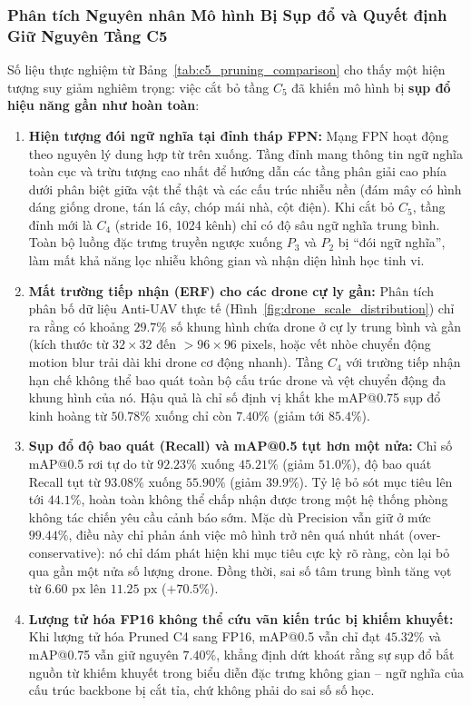 \documentclass[11pt,a4paper]{article}
\begin{document}
\subsubsection{Phân tích Nguyên nhân Mô hình Bị Sụp đổ và Quyết định Giữ Nguyên Tầng C5}
Số liệu thực nghiệm từ Bảng~\ref{tab:c5_pruning_comparison} cho thấy một hiện tượng suy giảm nghiêm trọng: việc cắt bỏ tầng $C_5$ đã khiến mô hình bị \textbf{sụp đổ hiệu năng gần như hoàn toàn}:
\begin{enumerate}
    \item \textbf{Hiện tượng đói ngữ nghĩa tại đỉnh tháp FPN:}
    Mạng FPN hoạt động theo nguyên lý dung hợp từ trên xuống. Tầng đỉnh mang thông tin ngữ nghĩa toàn cục và trừu tượng cao nhất để hướng dẫn các tầng phân giải cao phía dưới phân biệt giữa vật thể thật và các cấu trúc nhiễu nền (đám mây có hình dáng giống drone, tán lá cây, chóp mái nhà, cột điện). Khi cắt bỏ $C_5$, tầng đỉnh mới là $C_4$ (stride 16, 1024 kênh) chỉ có độ sâu ngữ nghĩa trung bình. Toàn bộ luồng đặc trưng truyền ngược xuống $P_3$ và $P_2$ bị ``đói ngữ nghĩa'', làm mất khả năng lọc nhiễu không gian và nhận diện hình học tinh vi.
    \item \textbf{Mất trường tiếp nhận (ERF) cho các drone cự ly gần:}
    Phân tích phân bố dữ liệu Anti-UAV thực tế (Hình~\ref{fig:drone_scale_distribution}) chỉ ra rằng có khoảng $29.7\%$ số khung hình chứa drone ở cự ly trung bình và gần (kích thước từ $32 \times 32$ đến $> 96 \times 96$ pixels, hoặc vết nhòe chuyển động motion blur trải dài khi drone cơ động nhanh). Tầng $C_4$ với trường tiếp nhận hạn chế không thể bao quát toàn bộ cấu trúc drone và vệt chuyển động đa khung hình của nó. Hậu quả là chỉ số định vị khắt khe mAP@0.75 sụp đổ kinh hoàng từ $50.78\%$ xuống chỉ còn $7.40\%$ (giảm tới $85.4\%$).
    \item \textbf{Sụp đổ độ bao quát (Recall) và mAP@0.5 tụt hơn một nửa:}
    Chỉ số mAP@0.5 rơi tự do từ $92.23\%$ xuống $45.21\%$ (giảm $51.0\%$), độ bao quát Recall tụt từ $93.08\%$ xuống $55.90\%$ (giảm $39.9\%$). Tỷ lệ bỏ sót mục tiêu lên tới $44.1\%$, hoàn toàn không thể chấp nhận được trong một hệ thống phòng không tác chiến yêu cầu cảnh báo sớm. Mặc dù Precision vẫn giữ ở mức $99.44\%$, điều này chỉ phản ánh việc mô hình trở nên quá nhút nhát (over-conservative): nó chỉ dám phát hiện khi mục tiêu cực kỳ rõ ràng, còn lại bỏ qua gần một nửa số lượng drone. Đồng thời, sai số tâm trung bình tăng vọt từ $6.60\text{ px}$ lên $11.25\text{ px}$ ($+70.5\%$).
    \item \textbf{Lượng tử hóa FP16 không thể cứu vãn kiến trúc bị khiếm khuyết:}
    Khi lượng tử hóa Pruned C4 sang FP16, mAP@0.5 vẫn chỉ đạt $45.32\%$ và mAP@0.75 vẫn giữ nguyên $7.40\%$, khẳng định dứt khoát rằng sự sụp đổ bắt nguồn từ khiếm khuyết trong biểu diễn đặc trưng không gian -- ngữ nghĩa của cấu trúc backbone bị cắt tỉa, chứ không phải do sai số số học.
\end{enumerate}
\end{document}
